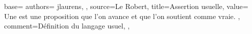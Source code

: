 {
  base={
    authors={
      jlaurens,
    },
    source=Le Robert,
    title=Assertion usuelle,
    value={
      Une  est une proposition que l'on avance et que l'on soutient comme vraie.
    },
    comment={Définition du langage usuel},
  },
}
